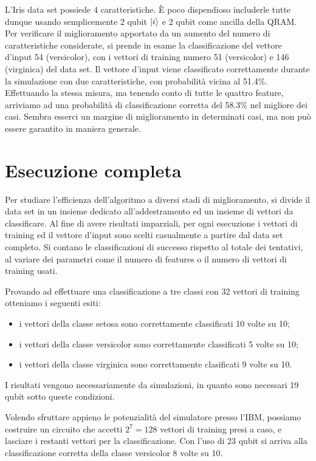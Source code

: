 
L'Iris data set possiede 4 caratteristiche. È poco dispendioso includerle tutte 
dunque usando semplicemente 2 qubit $\ket{i}$ e 2 qubit come ancilla della \ac{QRAM}. 
Per verificare il miglioramento apportato da un aumento del numero di caratteristiche 
considerate, si prende in esame la classificazione del vettore d'input 54 (versicolor), 
con i vettori di training numero 51 (versicolor) e 146 (virginica) del data set. 
Il vettore d'input viene classificato correttamente durante la simulazione con due caratteristiche, 
con probabilità vicina al 51.4\%. 
Effettuando la stessa misura, ma tenendo conto di tutte le quattro feature, arriviamo ad 
una probabilità di classificazione corretta del 58.3\% nel migliore dei casi. 
Sembra esserci un margine di miglioramento in determinati casi, 
ma non può essere garantito in maniera generale. 

\section{Esecuzione completa}

Per studiare l'efficienza dell'algoritmo a diversi stadi di miglioramento, 
si divide il data set in un insieme dedicato all'addestramento ed un insieme 
di vettori da classificare. Al fine di avere risultati imparziali, 
per ogni esecuzione i vettori di training ed il vettore d'input 
sono scelti casualmente a partire dal data set completo. 
Si contano le classificazioni di successo 
rispetto al totale dei tentativi, al variare dei parametri come il numero 
di features o il numero di vettori di training usati. 

Provando ad effettuare una classificazione a tre classi con 32 vettori di 
training otteniamo i seguenti esiti: 
\begin{itemize}
    \item i vettori della classe setosa sono correttamente classificati 10 volte su 10;
    \item i vettori della classe versicolor sono correttamente classificati 5 volte su 10;
    \item i vettori della classe virginica sono correttamente clasificati 9 volte su 10.
\end{itemize}
I risultati vengono necessariamente da simulazioni, in quanto sono necessari 
19 qubit sotto queste condizioni. 

Volendo sfruttare appieno le potenzialità del simulatore presso l'IBM, 
possiamo costruire un circuito che accetti $2^7 = 128$ vettori di training 
presi a caso, e lasciare i restanti vettori per la classificazione. 
Con l'uso di 23 qubit si arriva alla classificazione corretta della classe versicolor 
8 volte su 10. 